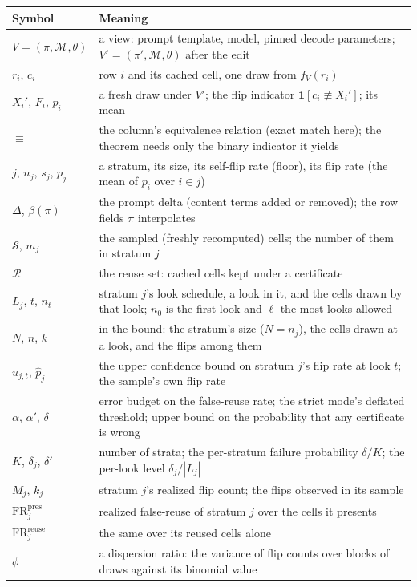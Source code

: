 \begin{table}[t]
\begin{minipage}[t]{0.49\textwidth}
\begin{tabular}{@{}>{\raggedright\arraybackslash}p{1.9cm}>{\raggedright\arraybackslash}p{6.2cm}@{}}
\bottomrule
\end{tabular}
\end{minipage}\hfill
\begin{minipage}[t]{0.49\textwidth}
\vspace{0pt}
\begin{tabular}{@{}lp{6.0cm}@{}}
\toprule
Symbol & Meaning \\
\midrule
$V=(\pi,\mathcal{M},\theta)$ & a view: prompt template, model, pinned decode parameters; $V'=(\pi',\mathcal{M},\theta)$ after the edit \\
$r_i$, $c_i$ & row $i$ and its cached cell, one draw from $f_V(r_i)$ \\
$X_i'$, $F_i$, $p_i$ & a fresh draw under $V'$; the flip indicator $\mathbf{1}[c_i \not\equiv X_i']$; its mean \\
$\equiv$ & the column's equivalence relation (exact match here); the theorem needs only the binary indicator it yields \\
$j$, $n_j$, $s_j$, $p_j$ & a stratum, its size, its self-flip rate (floor), its flip rate (the mean of $p_i$ over $i \in j$) \\
$\Delta$, $\beta(\pi)$ & the prompt delta (content terms added or removed); the row fields $\pi$ interpolates \\
$\mathcal{S}$, $m_j$ & the sampled (freshly recomputed) cells; the number of them in stratum $j$ \\
$\mathcal{R}$ & the reuse set: cached cells kept under a certificate \\
$L_j$, $t$, $n_t$ & stratum $j$'s look schedule, a look in it, and the cells drawn by that look; $n_0$ is the first look and $\ell$ the most looks allowed \\
$N$, $n$, $k$ & in the bound: the stratum's size ($N = n_j$), the cells drawn at a look, and the flips among them \\
$u_{j,t}$, $\hat{p}_j$ & the upper confidence bound on stratum $j$'s flip rate at look $t$; the sample's own flip rate \\
$\alpha$, $\alpha'$, $\delta$ & error budget on the false-reuse rate; the strict mode's deflated threshold; upper bound on the probability that any certificate is wrong \\
$K$, $\delta_j$, $\delta'$ & number of strata; the per-stratum failure probability $\delta/K$; the per-look level $\delta_j/|L_j|$ \\
$M_j$, $k_j$ & stratum $j$'s realized flip count; the flips observed in its sample \\
$\mathrm{FR}^{\mathrm{pres}}_j$ & realized false-reuse of stratum $j$ over the cells it presents \\
$\mathrm{FR}^{\mathrm{reuse}}_j$ & the same over its reused cells alone \\
$\phi$ & a dispersion ratio: the variance of flip counts over blocks of draws against its binomial value \\
\bottomrule
\end{tabular}


\end{minipage}
\end{table}
